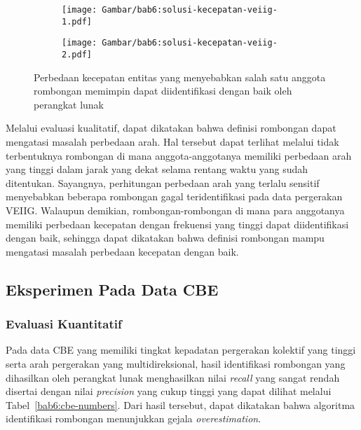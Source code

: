 \begin{figure}[h]
    \centering
    \captionsetup{width=.7\textwidth}
    \begin{subfigure}[h]{0.235\textwidth}
        \centering
        \texttt{[image: Gambar/bab6:solusi-kecepatan-veiig-1.pdf]}
    \end{subfigure}
    \begin{subfigure}[h]{0.235\textwidth}
        \centering
        \texttt{[image: Gambar/bab6:solusi-kecepatan-veiig-2.pdf]}
    \end{subfigure}
    \caption[Penyelesaian masalah beda kecepatan pada data VEIIG]{Perbedaan kecepatan entitas yang menyebabkan salah satu anggota rombongan memimpin dapat diidentifikasi dengan baik oleh perangkat lunak}
    \label{bab6:solusi-beda-kecepatan-veiig}
\end{figure}

Melalui evaluasi kualitatif, dapat dikatakan bahwa definisi rombongan dapat mengatasi masalah perbedaan arah. Hal tersebut dapat terlihat melalui tidak terbentuknya rombongan di mana anggota-anggotanya memiliki perbedaan arah yang tinggi dalam jarak yang dekat selama rentang waktu yang sudah ditentukan. Sayangnya, perhitungan perbedaan arah yang terlalu sensitif menyebabkan beberapa rombongan gagal teridentifikasi pada data pergerakan VEIIG. Walaupun demikian, rombongan-rombongan di mana para anggotanya memiliki perbedaan kecepatan dengan frekuensi yang tinggi dapat diidentifikasi dengan baik, sehingga dapat dikatakan bahwa definisi rombongan mampu mengatasi masalah perbedaan kecepatan dengan baik.

\subsection{Eksperimen Pada Data CBE}
\label{subsec:cbe-result}

\subsubsection{Evaluasi Kuantitatif}
\label{subsubsec:cbe-quantitative}

Pada data CBE yang memiliki tingkat kepadatan pergerakan kolektif yang tinggi serta arah pergerakan yang multidireksional, hasil identifikasi rombongan yang dihasilkan oleh perangkat lunak menghasilkan nilai \textit{recall} yang sangat rendah disertai dengan nilai \textit{precision} yang cukup tinggi yang dapat dilihat melalui Tabel~\ref{bab6:cbe-numbers}. Dari hasil tersebut, dapat dikatakan bahwa algoritma identifikasi rombongan menunjukkan gejala \textit{overestimation}.

